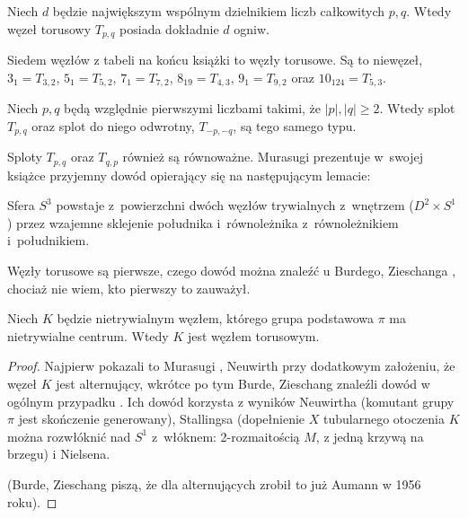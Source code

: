 \begin{proposition}
    Niech $d$ będzie największym wspólnym dzielnikiem liczb całkowitych $p, q$.
    Wtedy węzeł torusowy $T_{p, q}$ posiada dokładnie $d$ ogniw.
\end{proposition}

Siedem węzłów z tabeli na końcu książki to węzły torusowe.
Są to niewęzeł, $3_1 = T_{3,2}$, $5_1 = T_{5,2}$, $7_1 = T_{7,2}$, $8_{19} = T_{4,3}$, $9_1 = T_{9,2}$ oraz $10_{124} = T_{5, 3}$.

\begin{proposition}
    Niech $p, q$ będą względnie pierwszymi liczbami takimi, że $|p|, |q| \ge 2$.
    Wtedy splot $T_{p, q}$ oraz splot do niego odwrotny, $T_{-p, -q}$, są tego samego typu.
\end{proposition}

Sploty $T_{p, q}$ oraz $T_{q, p}$ również są równoważne.
Murasugi prezentuje w~swojej książce \cite{murasugi96} przyjemny dowód opierający się na następującym lemacie:

\begin{lemma}
    Sfera $S^3$ powstaje z~powierzchni dwóch węzłów trywialnych z~wnętrzem ($D^2 \times S^1$) przez wzajemne sklejenie południka i~równoleżnika z~równoleżnikiem i~południkiem.
\end{lemma}

Węzły torusowe są pierwsze, czego dowód można znaleźć u Burdego, Zieschanga \cite[s. 95]{burde14}, chociaż nie wiem, kto pierwszy to zauważył.

\begin{proposition}
\label{prp:torus_nontrivial_center}
    Niech $K$ będzie nietrywialnym węzłem, którego grupa podstawowa $\pi$ ma nietrywialne centrum.
    Wtedy $K$ jest węzłem torusowym.
\end{proposition}

\begin{proof}
%
%
%
%
%
%
    Najpierw pokazali to Murasugi \cite{murasugi61}, Neuwirth \cite{neuwirth61} przy dodatkowym założeniu, że węzeł $K$ jest alternujący,
    wkrótce po tym Burde, Zieschang znaleźli dowód w ogólnym przypadku \cite{zieschang66}.
    Ich dowód korzysta z wyników Neuwirtha (komutant grupy $\pi$ jest skończenie generowany), Stallingsa (dopełnienie $X$ tubularnego otoczenia $K$ można rozwłóknić nad $S^1$ z~włóknem: 2-rozmaitością $M$, z jedną krzywą na brzegu) i Nielsena.

    (Burde, Zieschang piszą, że dla alternujących zrobił to już Aumann w 1956 roku).
\end{proof}

